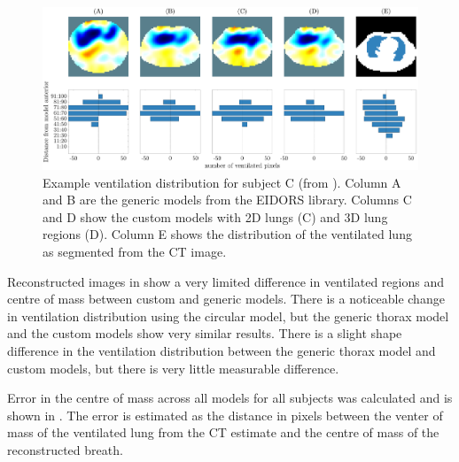 \begin{figure}
	\centering
	\includegraphics[width=\textwidth]{chapter5-CT_to_mesh/imgs/center_of_vent_PT04.pdf}
	\caption[Example ventilation distributions]{\label{fig:c-of-m-results}%
	Example ventilation distribution for subject C (from ).
	Column A and B are the generic models from the EIDORS library. 
	Columns C and D show the custom models with 2D lungs (C) and 3D lung regions (D).
	Column E shows the distribution of the ventilated lung as segmented from the CT image. 
	}
\end{figure}

Reconstructed images in 
show a very limited difference in ventilated regions 
and centre of mass between custom and generic models. There is a 
noticeable change in ventilation distribution using the circular model, but the 
generic thorax model and the custom models show very similar results. 
There is a slight shape difference in the ventilation distribution between the generic thorax model 
and custom models, but there is very little measurable difference. 

Error in the centre of mass across all models for all subjects was calculated and is 
shown in . The error is estimated as the distance in pixels 
between the venter of mass of the ventilated lung from the CT estimate and the 
centre of mass of the reconstructed breath. 

